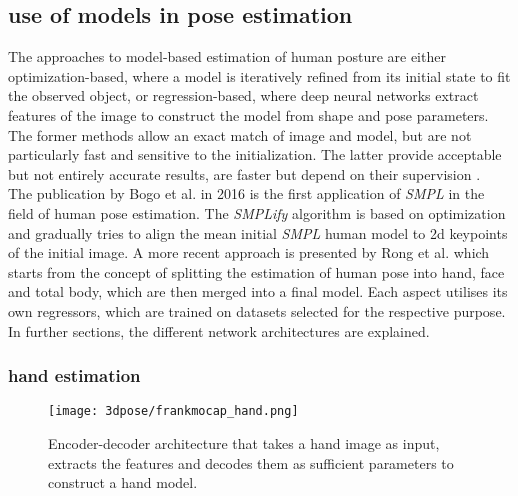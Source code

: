 \subsection{use of models in pose estimation}
The approaches to model-based estimation of human posture are either optimization-based, where a model is iteratively refined from its initial state to fit the observed object, or regression-based, where deep neural networks extract features of the image to construct the model from shape and pose parameters. The former methods allow an exact match of image and model, but are not particularly fast and sensitive to the initialization. The latter provide acceptable but not entirely accurate results, are faster but depend on their supervision \cite{spin}. \\
The publication by Bogo et al. \cite{simplify} in 2016 is the first application of \emph{SMPL} in the field of human pose estimation. The \emph{SMPLify} algorithm is based on optimization and gradually tries to align the mean initial \emph{SMPL} human model to 2d keypoints of the initial image. A more recent approach is presented by Rong et al. \cite{frankmocap} which starts from the concept of splitting the estimation of human pose into hand, face and total body, which are then merged into a final model. Each aspect utilises its own regressors, which are trained on datasets selected for the respective purpose. In further sections, the different network architectures are explained.

\subsubsection{hand estimation}
\begin{figure}[h]
	\centering
	\texttt{[image: 3dpose/frankmocap\_hand.png]}
	\caption{Encoder-decoder architecture that takes a hand image as input, extracts the features and decodes them as sufficient parameters to construct a hand model.\cite{frankmocap}}
	\label{fig:frankmocap_hand}
\end{figure}

